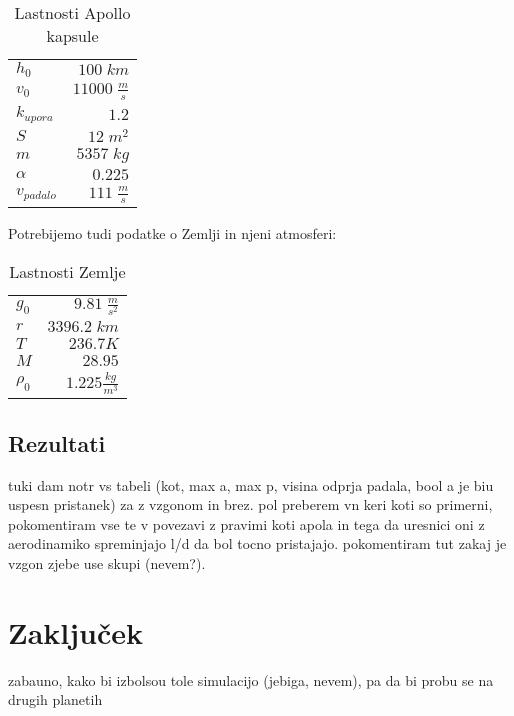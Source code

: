 \documentclass[11pt,a4paper]{article}
\begin{document}
\begin{table}[H]
	\centering
	\caption{Lastnosti Apollo kapsule \cite{lift-and-drag-of-apollo-command-module} \cite{command-module-overview} \cite{entry-aerodynamics} }
	\vspace{0.3cm}
	\def\arraystretch{1.5}
	\begin{tabular}{l|r}
		$h_0$ & $100 \; km$ \\
		$v_0$ & $11000 \; \frac{m}{s}$ \\
		$k_{upora}$ & $1.2$ \\
		$S$ & $12 \; m^2$ \\
		$m$ & $5357 \; kg $\\
		$\alpha$ & $0.225$ \\
		$v_{padalo}$ & $111 \; \frac{m}{s}$
	\end{tabular}
	\def\arraystretch{1}
\end{table}
\vspace{0.4cm}
Potrebijemo tudi podatke o Zemlji in njeni atmosferi:
\begin{table}[H]
	\centering
	\caption{Lastnosti Zemlje \cite{earths-atmosphere}}
	\vspace{0.3cm}
	\def\arraystretch{1.5}
	\begin{tabular}{l|r}
		$g_0$ & $9.81 \; \frac{m}{s^2}$ \\
		$r$ & $3396.2 \; km$ \\
		$T$ & $236.7 K$ \\
		$M$ & $28.95$ \\
		$\rho_0$ & $1.225 \frac{kg}{m^3} $
	\end{tabular}
	\def\arraystretch{1}
\end{table}

\clearpage

\subsection{Rezultati}
tuki dam notr vs tabeli (kot, max a, max p, visina odprja padala, bool a je biu uspesn pristanek) za z vzgonom in brez. pol preberem vn keri koti so primerni, pokomentiram vse te v povezavi z pravimi koti apola in tega da uresnici oni z aerodinamiko spreminjajo l/d da bol tocno pristajajo. pokomentiram tut zakaj je vzgon zjebe use skupi (nevem?).

\clearpage
\section{Zaklju\v cek}
zabauno, kako bi izbolsou tole simulacijo (jebiga, nevem), pa da bi probu se na drugih planetih
\end{document}
